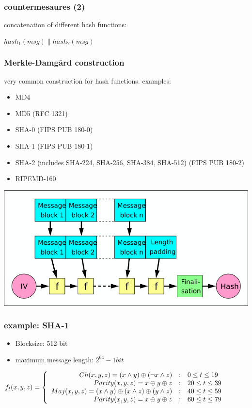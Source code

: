 \begin{frame}
\frametitle{countermesaures (2)}
	concatenation of different hash functions:
	\par
	\begin{center}$hash_1 (msg) \parallel hash_2(msg)$\end{center}
\end{frame}


\begin{frame}
\frametitle{Merkle-Damgård construction}
	very common construction for hash functions.
	examples:
	\begin{itemize}
		\item MD4
		\item MD5 (RFC 1321)
		\item SHA-0 (FIPS PUB 180-0) 
		\item SHA-1 (FIPS PUB 180-1) 
		\item SHA-2 (includes SHA-224, SHA-256, SHA-384, SHA-512) (FIPS PUB 180-2)
		\item RIPEMD-160
	\end{itemize}
	\begin{center}\includegraphics[scale=0.35]{Merkle-Damgard_hash_big}\end{center}
\end{frame}


\begin{frame}
\frametitle{example: SHA-1}
	\begin{itemize}
	\item Blocksize: 512 bit
	\item maximum message length: $2^{64}-1 bit$
	\end{itemize}
	
	$
	f_t(x,y,z) = 	\left\{ 
	\begin{array}{r@{\quad:\quad}l}
	 Ch(x,y,z) = (x \wedge y) \oplus (\neg x \wedge z) &  0\le t\le 19 \\
	 Parity(x,y,z) = x \oplus y \oplus z               & 20\le t\le 39 \\
	 Maj(x,y,z) = (x \wedge y) \oplus (x \wedge z) \oplus (y \wedge z)  & 40\le t\le 59 \\
	 Parity(x,y,z) = x \oplus y \oplus z               & 60\le t\le 79
	\end{array}
	\right.
	$
\end{frame}












